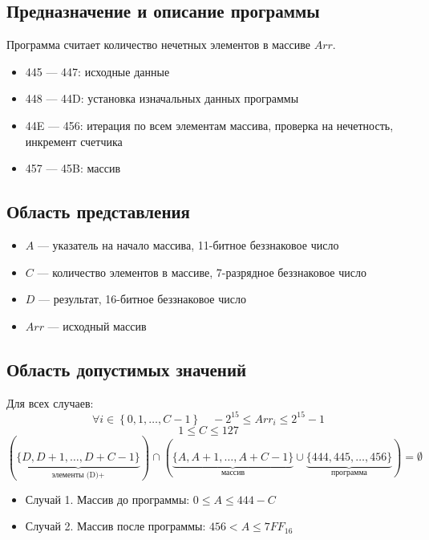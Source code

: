 \subsection{Предназначение и описание программы}
Программа считает количество нечетных элементов в массиве $Arr$.
\begin{itemize}
    \item 445 --- 447: исходные данные
    \item 448 --- 44D: установка изначальных данных программы
    \item 44E --- 456: итерация по всем элементам массива, проверка на нечетность, инкремент счетчика
    \item 457 --- 45B: массив
\end{itemize}

\subsection{Область представления}
\begin{itemize}
    \item $A$ --- указатель на начало массива, 11-битное беззнаковое число
    \item $C$ --- количество элементов в массиве, 7-разрядное беззнаковое число
    \item $D$ --- результат, 16-битное беззнаковое число
    \item $Arr$ --- исходный массив
\end{itemize}

\subsection{Область допустимых значений}
Для всех случаев:
\[ \forall i \in \left\{0, 1, \ldots, C-1  \right\} \quad -2^{15} \leq Arr_i \leq 2^{15} - 1 \]
\[ 1 \leq C \leq 127 \]
\[ (\underbrace{\{D, D+1, \ldots, D+C-1\}}_{\text{элементы (D)+}}) \cap (\underbrace{\{A, A+1, \ldots, A+C-1\}}_{\text{массив}} \cup \underbrace{\{444, 445, \ldots, 456\}}_{\text{программа}}) = \emptyset \]
\begin{itemize}

    \item Случай 1. Массив до программы:
    $0 \leq A \leq 444 - C$

    \item Случай 2. Массив после программы:
    $456 < A \leq 7FF_{16}$
\end{itemize}
